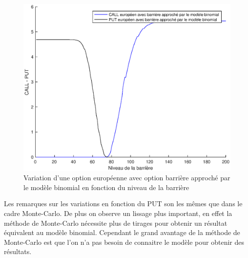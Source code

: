 \begin{figure}[H]
\centering
\includegraphics[scale=0.6]{./img/CALL_PUT_MB_BAR.eps}
\caption{Variation d'une option européenne avec option barrière approché par le modèle binomial en fonction du niveau de la barrière}
\label{fig:call_put_bar_mb}
\end{figure}

Les remarques sur les variations en fonction du PUT son les mêmes que dans le cadre Monte-Carlo. De plus on observe un lissage plus important, en effet la méthode de Monte-Carlo nécessite plus de tirages pour obtenir un résultat équivalent au modèle binomial. Cependant le grand avantage de la méthode de Monte-Carlo est que l'on n'a pas besoin de connaitre le modèle pour obtenir des résultats.

